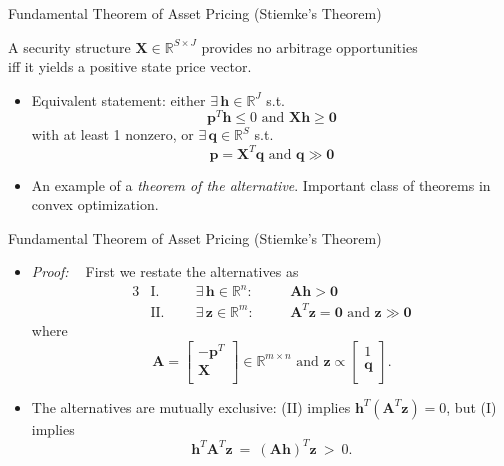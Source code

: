 \documentclass[aspectratio=1610]{beamer}
\newcommand{\st}{s.t.\ }
\newcommand{\eq}{\ =\ }
\newcommand{\andsp}{\text{ \ \ and \ \ }}
\newcommand{\bb}{\mathbb}
\begin{document}
\begin{frame}{Fundamental Theorem of Asset Pricing (Stiemke's Theorem)}

\vspace{5ex}
{\large A security structure $\bm X\in \bb R^{S\times J}$ provides no arbitrage opportunities
\\ iff it yields a positive state price vector.}
\vspace{5ex}

\begin{itemize}
  \item Equivalent statement: either $\exists\, \bm h \in \bb R^J$ \st
  $$\bm p^T \bm h \leq 0 \andsp \bm{Xh}\geq \bm 0$$
  with at least 1 nonzero, or $\exists\, \bm q\in \bb R^S$ \st
  $$\bm p = \bm X^T\bm q \andsp \bm q \gg \bm 0$$

  \item An example of a {\em theorem of the alternative}. Important class of theorems in convex optimization.
\end{itemize}
\end{frame}

\begin{frame}{Fundamental Theorem of Asset Pricing (Stiemke's Theorem)}
\begin{itemize}
  \item {\em Proof: \ } First we restate the alternatives as
  \begin{alignat}{3}
    &\text{I.} \quad &&\bm \exists\, \bm h \in \bb R^n: \quad
    &&\bm{Ah} > \bm 0 \\
    &\text{II.} &&\bm \exists\, \bm z \in \bb R^m:
    &&\bm A^T\bm z = \bm 0 \andsp \bm z \gg \bm 0
  \end{alignat}
  where
  \begin{equation}
    \bm A = \begin{bmatrix}
      -\bm p^T \\
      \bm X \\
    \end{bmatrix}
    \in \bb R^{m\times n} \andsp
    \bm z \propto \begin{bmatrix}
      1 \\
      \bm q \\
    \end{bmatrix}.
  \end{equation}
  \vspace{1ex}

  \item The alternatives are mutually exclusive: (II) implies $\bm h^T(\bm A^T\bm z) = 0$, but (I) implies
  $$ \bm h^T\bm A^T\bm z \eq (\bm{Ah})^T\bm z \ > \ 0.$$
\end{itemize}
\end{frame}
\end{document}
